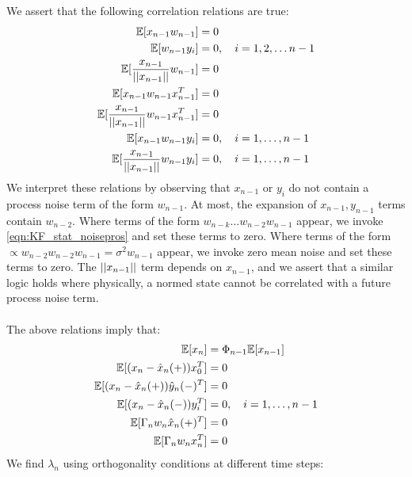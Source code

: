 We assert that the following correlation relations are true:
\begin{align}
\mathbb{E}[x_{n-1}w_{n-1}] & = 0 \label{eqn:KF_reln_4}\\
\mathbb{E}[w_{n-1} y_i] &= 0, \quad i = 1,2,\dots n-1 \label{eqn:KF_reln_5}\\
\mathbb{E}[\frac{x_{n-1}}{||x_{n-1}||}w_{n-1}] & = 0 \label{eqn:KF_reln_6}\\
\mathbb{E}[x_{n-1} w_{n-1} x_{n-1}^T ] & = 0 \label{eqn:KF_reln_7}\\
\mathbb{E}[\frac{x_{n-1}}{||x_{n-1}||} w_{n-1} x_{n-1}^T ] & = 0 \label{eqn:KF_reln_8} \\
\mathbb{E}[x_{n-1} w_{n-1} y_i ] & = 0, \quad i = 1,\dots, n-1 \label{eqn:KF_reln_9}\\
\mathbb{E}[\frac{x_{n-1}}{||x_{n-1}||} w_{n-1} y_i ] & = 0, \quad i = 1,\dots, n-1 \label{eqn:KF_reln_10}
\end{align}
We interpret these relations by observing that $x_{n-1}$ or $y_i$ do not contain a process noise term of the form $w_{n-1}$. At most, the expansion of $x_{n-1}, y_{n-1}$ terms contain $w_{n-2}$. Where terms of the form $w_{n-k}\dots w_{n-2}w_{n-1}$ appear, we invoke \ref{eqn:KF_stat_noisepros} and set these terms to zero. Where terms of the form $\propto w_{n-2}w_{n-2}w_{n-1} = \sigma^2 w_{n-1}$ appear, we invoke zero mean noise and set these terms to zero. The $||x_{n-1}||$ term depends on $x_{n-1}$, and we assert that a similar logic holds where physically, a normed state cannot be correlated with a future process noise term.
\\
\\
The above relations imply that:
\begin{align}
\mathbb{E}[x_n] &= \Phi_{n-1}\mathbb{E}[x_{n-1}] \label{eqn:KF_reln_11}\\
\mathbb{E}[(x_n - \hat{x}_{n}(+))x_0^T] &= 0 \label{eqn:KF_reln_12}\\
\mathbb{E}[(x_n - \hat{x}_{n}(+))\hat{y}_n(-)^T] &=0 \label{eqn:KF_reln_13} \\
\mathbb{E}[(x_n - \hat{x}_{n}(-))y_i^T] &=0, \quad i = 1,\dots, n-1\label{eqn:KF_reln_14}\\
\mathbb{E}[\Gamma_n w_n \hat{x}_{n}(+)^T] &=0 \label{eqn:KF_reln_16}\\
\mathbb{E}[\Gamma_n w_n x_n^T] &=0 \label{eqn:KF_reln_17} 
\end{align}
We  find $\lambda_n$ using orthogonality conditions at different time steps:

